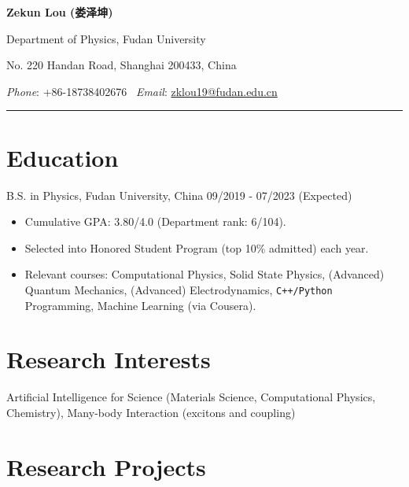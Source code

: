 \documentclass[11pt]{article} %
\begin{document}
\begin{center}

\textbf{\Large Zekun Lou ({\kaishu 娄泽坤})}

Department of Physics, Fudan University

No. 220 Handan Road, Shanghai 200433, China

{\itshape Phone}: +86-18738402676 \
{\itshape Email}: \href{mailto:zklou19@fudan.edu.cn}{zklou19@fudan.edu.cn}
\end{center}

\vspace{-3ex}
\rule{\textwidth}{1pt}
\vspace{-4ex}



\section*{Education}

B.S. in Physics, Fudan University, China
\hfill 09/2019 - 07/2023 (Expected)

\begin{itemize}
    \item Cumulative GPA: 3.80/4.0 (Department rank: 6/104).
    \item Selected into Honored Student Program (top 10\% admitted) each year.
    \item Relevant courses: Computational Physics, Solid State Physics, (Advanced) Quantum Mechanics, (Advanced) Electrodynamics, \verb|C++/Python| Programming, Machine Learning (via Cousera).
\end{itemize}





\section*{Research Interests}

Artificial Intelligence for Science (Materials Science, Computational Physics, Chemistry), Many-body Interaction (excitons and coupling)


\section*{Research Projects}
\end{document}
